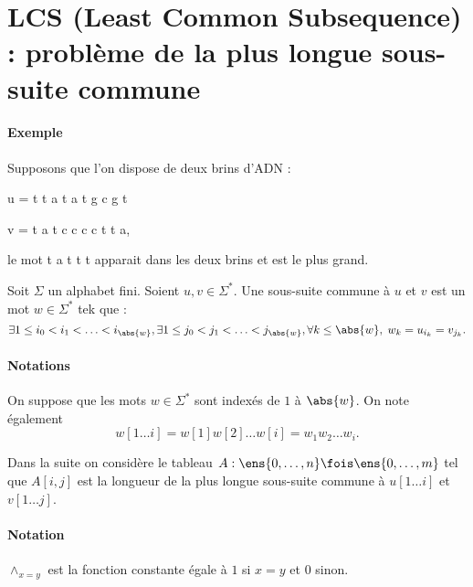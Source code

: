\documentclass{mybourbaki}
\begin{document}
\section{LCS (Least Common Subsequence) : problème de la plus longue sous-suite commune}

\paragraph{Exemple}Supposons que l'on dispose de deux brins d'ADN : 
\begin{center}
u = t t a t a t g c g t

v = t a t c c c c t t a,
\end{center}
le mot \og t a t t t \fg{} apparait dans les deux brins et est le plus grand.

Soit $\Sigma$ un alphabet fini. 
Soient $u,v\in \Sigma^{*}$. Une sous-suite commune à $u$ et $v$ est un mot $w\in \Sigma^{*}$ tek que : \[ \exists 1\leq i_0 < i_1< \ldots < i_{\abs{w}}, \exists 1 \leq j_0 < j_1 < \ldots < j_{\abs{w}}, \forall k \leq \abs{w}, \; w_{k} = u_{i_k}=v_{j_k}.\]

\paragraph{Notations}On suppose que les mots $w\in \Sigma^{*}$ sont indexés de $1$ à $\abs{w}$. On note également \[ w[1\ldots i] = w[1]w[2]\ldots w[i] = w_1w_2\ldots w_i.\]

Dans la suite on considère le tableau $A : \ens{0,\ldots,n}\fois \ens{0,\ldots,m}$ tel que $A[i,j]$ est la longueur de la plus longue sous-suite commune à $u[1\ldots i]$ et $v[1\ldots j]$.


\paragraph{Notation}$\wedge_{x=y}$ est la fonction constante égale à $1$ si $x=y$ et $0$ sinon.
\end{document}
